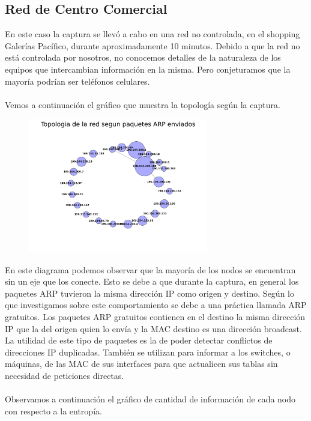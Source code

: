 \subsection{Red de Centro Comercial}

En este caso la captura se llevó a cabo en una red no controlada, en el shopping Galerías Pacífico, durante aproximadamente 10 minutos.
Debido a que la red no está controlada por nosotros, no conocemos detalles de la naturaleza de los equipos que intercambian información en la misma. Pero conjeturamos que la mayoría podrían ser teléfonos celulares.
\\\\
Vemos a continuación el gráfico que muestra la topología según la captura.

\FloatBarrier

\begin{figure}[ht!]
  \centering
   \includegraphics[width=0.7\textwidth]{graficos/shopping_network.png}
  \caption{}
  \label{fig:shopping_network}
\end{figure}

\FloatBarrier

En este diagrama podemos observar que la mayoría de los nodos se encuentran sin un eje que los conecte. Esto se debe a que durante la captura, en general los paquetes ARP tuvieron la misma dirección IP como origen y destino. Según lo que investigamos sobre este comportamiento se debe a una práctica llamada ARP gratuitos. Los paquetes ARP gratuitos contienen en el destino la misma dirección IP que la del origen quien lo envía y la MAC destino es una dirección broadcast. La utilidad de este tipo de paquetes es la de poder detectar conflictos de direcciones IP duplicadas. También se utilizan para informar a los switches, o máquinas, de las MAC de sus interfaces para que actualicen sus tablas sin necesidad de peticiones directas.
\\\\
Observamos a continuación el gráfico de cantidad de información de cada nodo con respecto a la entropía.

